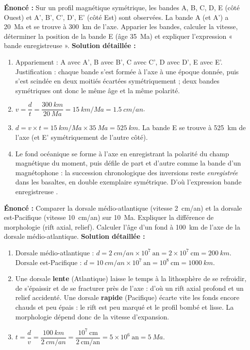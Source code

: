 \documentclass[11pt]{article}
\begin{document}
\begin{corrige}
\textbf{Énoncé :} Sur un profil magnétique symétrique, les bandes A, B, C, D, E (côté Ouest) et A', B', C', D', E' (côté Est) sont observées. La bande A (et A') a \SI{20}{Ma} et se trouve à \SI{300}{km} de l'axe. Apparier les bandes, calculer la vitesse, déterminer la position de la bande E (âge \SI{35}{Ma}) et expliquer l'expression « bande enregistreuse ».
\tcblower
\textbf{Solution détaillée :}
\begin{enumerate}
\item Appariement : A avec A', B avec B', C avec C', D avec D', E avec E'. Justification : chaque bande s'est formée à l'axe à une époque donnée, puis s'est scindée en deux moitiés écartées symétriquement ; deux bandes symétriques ont donc le même âge et la même polarité.
\item $v = \dfrac{d}{t} = \dfrac{\SI{300}{km}}{\SI{20}{Ma}} = \SI{15}{km/Ma} = \SI{1,5}{cm/an}$.
\item $d = v \times t = \SI{15}{km/Ma} \times \SI{35}{Ma} = \SI{525}{km}$. La bande E se trouve à \SI{525}{km} de l'axe (et E' symétriquement de l'autre côté).
\item Le fond océanique se forme à l'axe en enregistrant la polarité du champ magnétique du moment, puis défile de part et d'autre comme la bande d'un magnétophone : la succession chronologique des inversions reste \emph{enregistrée} dans les basaltes, en double exemplaire symétrique. D'où l'expression \og bande enregistreuse \fg{}.
\end{enumerate}
\end{corrige}

\begin{corrige}
\textbf{Énoncé :} Comparer la dorsale médio-atlantique (vitesse \SI{2}{cm/an}) et la dorsale est-Pacifique (vitesse \SI{10}{cm/an}) sur \SI{10}{Ma}. Expliquer la différence de morphologie (rift axial, relief). Calculer l'âge d'un fond à \SI{100}{km} de l'axe de la dorsale médio-atlantique.
\tcblower
\textbf{Solution détaillée :}
\begin{enumerate}
\item Dorsale médio-atlantique : $d = \SI{2}{cm/an} \times 10^{7}\ \text{an} = 2 \times 10^{7}\ \text{cm} = \SI{200}{km}$. Dorsale est-Pacifique : $d = \SI{10}{cm/an} \times 10^{7}\ \text{an} = 10^{8}\ \text{cm} = \SI{1000}{km}$.
\item Une dorsale \textbf{lente} (Atlantique) laisse le temps à la lithosphère de se refroidir, de s'épaissir et de se fracturer près de l'axe : d'où un rift axial profond et un relief accidenté. Une dorsale \textbf{rapide} (Pacifique) écarte vite les fonds encore chauds et peu épais : le rift est peu marqué et le profil bombé et lisse. La morphologie dépend donc de la vitesse d'expansion.
\item $t = \dfrac{d}{v} = \dfrac{\SI{100}{km}}{\SI{2}{cm/an}} = \dfrac{10^{7}\ \text{cm}}{2\ \text{cm/an}} = 5 \times 10^{6}\ \text{an} = \SI{5}{Ma}$.
\end{enumerate}
\end{corrige}
\end{document}

